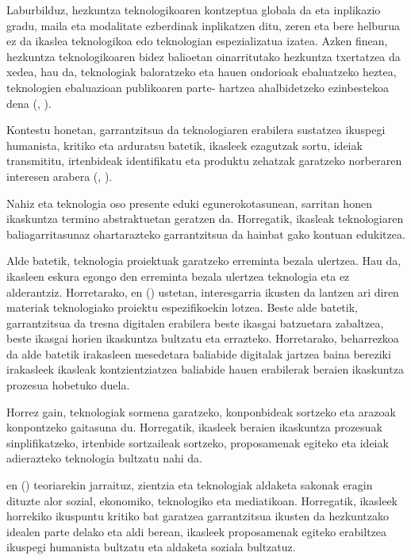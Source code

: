 Laburbilduz, hezkuntza teknologikoaren kontzeptua globala da eta inplikazio gradu, maila eta modalitate ezberdinak inplikatzen ditu, zeren eta bere helburua ez da ikaslea teknologikoa edo teknologian espezializatua izatea. Azken finean, hezkuntza teknologikoaren bidez balioetan oinarritutako hezkuntza txertatzea da xedea, hau da, teknologiak baloratzeko eta hauen ondorioak ebaluatzeko heztea, teknologien ebaluazioan publikoaren parte- hartzea ahalbidetzeko ezinbestekoa dena (\citeauthor{martin2000acercando}, \citeyear{martin2000acercando}).

Kontestu honetan, garrantzitsua da teknologiaren erabilera sustatzea ikuspegi humanista, kritiko eta arduratsu batetik, ikasleek ezagutzak sortu, ideiak transmititu, irtenbideak identifikatu eta produktu zehatzak garatzeko norberaren interesen arabera (\citeauthor{leal2019}, \citeyear{leal2019}).

Nahiz eta teknologia oso presente eduki egunerokotasunean, sarritan honen ikaskuntza termino abstraktuetan geratzen da. Horregatik, ikasleak teknologiaren baliagarritasunaz ohartarazteko garrantzitsua da hainbat gako kontuan edukitzea.

Alde batetik, teknologia proiektuak garatzeko erreminta bezala ulertzea. Hau da, ikasleen eskura egongo den erreminta bezala ulertzea teknologia eta ez alderantziz. Horretarako, \citeauthor{leal2019}en (\citeyear{leal2019}) ustetan, interesgarria ikusten da lantzen ari diren materiak teknologiako proiektu espezifikoekin lotzea. Beste alde batetik, garrantzitsua da tresna digitalen erabilera beste ikasgai batzuetara zabaltzea, beste ikasgai horien ikaskuntza bultzatu eta errazteko. Horretarako, beharrezkoa da alde batetik irakasleen mesedetara baliabide digitalak jartzea baina bereziki irakasleek ikasleak kontzientziatzea baliabide hauen erabilerak beraien ikaskuntza prozesua hobetuko duela.

Horrez gain, teknologiak sormena garatzeko, konponbideak sortzeko eta arazoak konpontzeko gaitasuna du. Horregatik, ikasleek beraien ikaskuntza prozesuak sinplifikatzeko, irtenbide sortzaileak sortzeko, proposamenak egiteko eta ideiak adierazteko teknologia bultzatu nahi da.

\citeauthor{leal2019}en (\citeyear{leal2019}) teoriarekin jarraituz, zientzia eta teknologiak aldaketa sakonak eragin dituzte alor sozial, ekonomiko, teknologiko eta mediatikoan. Horregatik, ikasleek horrekiko ikuspuntu kritiko bat garatzea garrantzitsua ikusten da hezkuntzako idealen parte delako eta aldi berean, ikasleek proposamenak egiteko erabiltzea ikuspegi humanista bultzatu eta aldaketa soziala bultzatuz.

